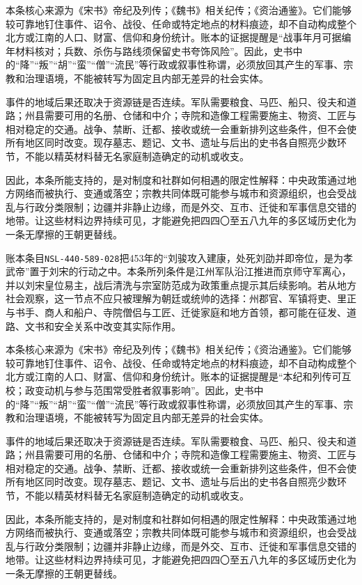 本条核心来源为《宋书》帝纪及列传；《魏书》相关纪传；《资治通鉴》。它们能够较可靠地钉住事件、诏令、战役、任命或特定地点的材料痕迹，却不自动构成整个北方或江南的人口、财富、信仰和身份统计。账本的证据提醒是“战事年月可据编年材料核对；兵数、杀伤与路线须保留史书夸饰风险”。因此，史书中的“降”“叛”“胡”“蛮”“僧”“流民”等行政或叙事性称谓，必须放回其产生的军事、宗教和治理语境，不能被转写为固定且内部无差异的社会实体。

事件的地域后果还取决于资源链是否连续。军队需要粮食、马匹、船只、役夫和道路；州县需要可用的名册、仓储和中介；寺院和造像工程需要施主、物资、工匠与相对稳定的交通。战争、禁断、迁都、接收或统一会重新排列这些条件，但不会使所有地区同时改变。现存墓志、题记、文书、遗址与后出的史书各自照亮少数环节，不能以精英材料替无名家庭制造确定的动机或收支。

因此，本条所能支持的，是对制度和社群如何相遇的限定性解释：中央政策通过地方网络而被执行、变通或落空；宗教共同体既可能参与城市和资源组织，也会受战乱与行政分类限制；边疆并非静止边缘，而是外交、互市、迁徙和军事信息交错的地带。让这些材料边界持续可见，才能避免把四四〇至五八九年的多区域历史化为一条无摩擦的王朝更替线。

账本条目\texttt{NSL-440-589-028}把453年的“刘骏攻入建康，处死刘劭并即帝位，是为孝武帝”置于刘宋的行动之中。本条所列条件是江州军队沿江推进而京师守军离心，并以刘宋皇位易主，战后清洗与宗室防范成为政策重点提示其后续影响。若从地方社会观察，这一节点不应只被理解为朝廷或统帅的选择：州郡官、军镇将吏、里正与书手、商人和船户、寺院僧侣与工匠、迁徙家庭和地方首领，都可能在征发、道路、文书和安全关系中改变其实际作用。

本条核心来源为《宋书》帝纪及列传；《魏书》相关纪传；《资治通鉴》。它们能够较可靠地钉住事件、诏令、战役、任命或特定地点的材料痕迹，却不自动构成整个北方或江南的人口、财富、信仰和身份统计。账本的证据提醒是“本纪和列传可互校；政变动机与参与范围常受胜者叙事影响”。因此，史书中的“降”“叛”“胡”“蛮”“僧”“流民”等行政或叙事性称谓，必须放回其产生的军事、宗教和治理语境，不能被转写为固定且内部无差异的社会实体。

事件的地域后果还取决于资源链是否连续。军队需要粮食、马匹、船只、役夫和道路；州县需要可用的名册、仓储和中介；寺院和造像工程需要施主、物资、工匠与相对稳定的交通。战争、禁断、迁都、接收或统一会重新排列这些条件，但不会使所有地区同时改变。现存墓志、题记、文书、遗址与后出的史书各自照亮少数环节，不能以精英材料替无名家庭制造确定的动机或收支。

因此，本条所能支持的，是对制度和社群如何相遇的限定性解释：中央政策通过地方网络而被执行、变通或落空；宗教共同体既可能参与城市和资源组织，也会受战乱与行政分类限制；边疆并非静止边缘，而是外交、互市、迁徙和军事信息交错的地带。让这些材料边界持续可见，才能避免把四四〇至五八九年的多区域历史化为一条无摩擦的王朝更替线。

